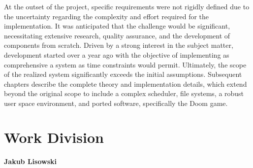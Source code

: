 \documentclass[a4paper,10pt,twoside]{report}
\theoremstyle{definition}
\begin{document}
At the outset of the project, specific requirements were not rigidly defined due to the uncertainty regarding the complexity and effort required for the implementation. It was anticipated that the challenge would be significant, necessitating extensive research, quality assurance, and the development of components from scratch. Driven by a strong interest in the subject matter, development started over a year ago with the objective of implementing as comprehensive a system as time constraints would permit. Ultimately, the scope of the realized system significantly exceeds the initial assumptions. Subsequent chapters describe the complete theory and implementation details, which extend beyond the original scope to include a complex scheduler, file systems, a robust user space environment, and ported software, specifically the Doom game.

\section{Work Division}

\paragraph{Jakub Lisowski}
\end{document}
